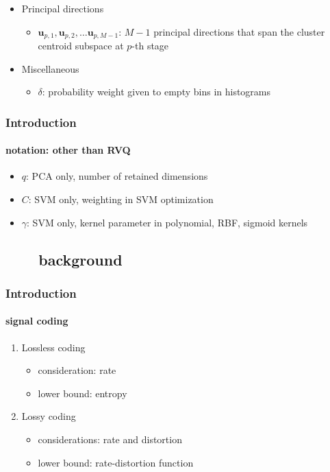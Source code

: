 \begin{frame}
\begin{itemize}
		\item Principal directions
			\begin{itemize}\tiny
				\item {\color{red}$\mathbf{u}_{p,1}, \mathbf{u}_{p,2}, \ldots \mathbf{u}_{p, {M-1}}$}: $M-1$ principal directions that span the cluster centroid subspace at $p$-th stage
			\end{itemize}
		\item Miscellaneous
			\begin{itemize}\tiny
				\item {\color{red}$\delta$}: probability weight given to empty bins in histograms
			\end{itemize}
	\end{itemize}
\end{frame}


\begin{frame}
\frametitle{Introduction}
\framesubtitle{notation: other than RVQ}
\logoCSIPCPL \mypagenum
	\begin{itemize}
		\item {\color{red}$q$}: PCA only, number of retained dimensions
		\item {\color{red}$C$}: SVM only, weighting in SVM optimization
		\item {\color{red}$\gamma$}: SVM only, kernel parameter in polynomial, RBF, sigmoid kernels
	\end{itemize}
\end{frame}

\subsection{\ \ \ \ background}
\begin{frame}
\frametitle{Introduction}
\framesubtitle{signal coding}
\logoCSIPCPL \mypagenum
	\value{finalframe}
	\begin{enumerate}
		\item Lossless coding
			\begin{itemize}
				\item consideration: {\color{blue}rate}
				\item lower bound: {\color{red}entropy}
			\end{itemize}
		\vspace{0.1in}
		\item Lossy coding
			\begin{itemize}
				\item considerations: {\color{blue}rate and distortion}
				\item lower bound: {\color{red}rate-distortion function}
			\end{itemize}
	\end{enumerate}
\end{frame}





